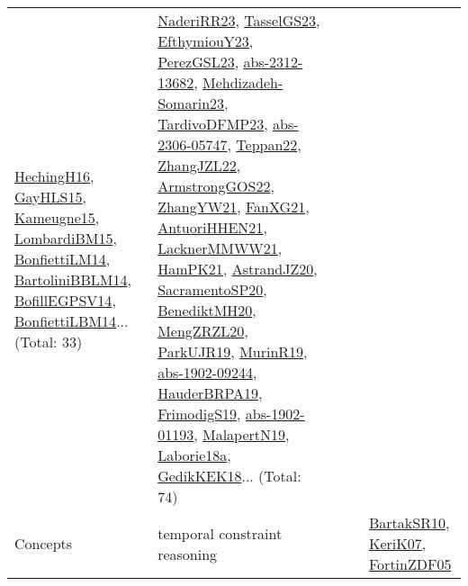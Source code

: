 {\begin{longtable}{lp{3cm}>{\raggedright}p{6cm}>{\raggedright}p{6cm}p{8cm}}
\href{papers/HechingH16.pdf}{HechingH16}\cite{HechingH16}, \href{papers/GayHLS15.pdf}{GayHLS15}\cite{GayHLS15}, \href{articles/Kameugne15.pdf}{Kameugne15}\cite{Kameugne15}, \href{papers/LombardiBM15.pdf}{LombardiBM15}\cite{LombardiBM15}, \href{papers/BonfiettiLM14.pdf}{BonfiettiLM14}\cite{BonfiettiLM14}, \href{papers/BartoliniBBLM14.pdf}{BartoliniBBLM14}\cite{BartoliniBBLM14}, \href{papers/BofillEGPSV14.pdf}{BofillEGPSV14}\cite{BofillEGPSV14}, \href{articles/BonfiettiLBM14.pdf}{BonfiettiLBM14}\cite{BonfiettiLBM14}... (Total: 33) & \href{articles/NaderiRR23.pdf}{NaderiRR23}\cite{NaderiRR23}, \href{papers/TasselGS23.pdf}{TasselGS23}\cite{TasselGS23}, \href{papers/EfthymiouY23.pdf}{EfthymiouY23}\cite{EfthymiouY23}, \href{papers/PerezGSL23.pdf}{PerezGSL23}\cite{PerezGSL23}, \href{articles/abs-2312-13682.pdf}{abs-2312-13682}\cite{abs-2312-13682}, \href{papers/Mehdizadeh-Somarin23.pdf}{Mehdizadeh-Somarin23}\cite{Mehdizadeh-Somarin23}, \href{papers/TardivoDFMP23.pdf}{TardivoDFMP23}\cite{TardivoDFMP23}, \href{articles/abs-2306-05747.pdf}{abs-2306-05747}\cite{abs-2306-05747}, \href{papers/Teppan22.pdf}{Teppan22}\cite{Teppan22}, \href{papers/ZhangJZL22.pdf}{ZhangJZL22}\cite{ZhangJZL22}, \href{papers/ArmstrongGOS22.pdf}{ArmstrongGOS22}\cite{ArmstrongGOS22}, \href{articles/ZhangYW21.pdf}{ZhangYW21}\cite{ZhangYW21}, \href{articles/FanXG21.pdf}{FanXG21}\cite{FanXG21}, \href{papers/AntuoriHHEN21.pdf}{AntuoriHHEN21}\cite{AntuoriHHEN21}, \href{papers/LacknerMMWW21.pdf}{LacknerMMWW21}\cite{LacknerMMWW21}, \href{articles/HamPK21.pdf}{HamPK21}\cite{HamPK21}, \href{articles/AstrandJZ20.pdf}{AstrandJZ20}\cite{AstrandJZ20}, \href{articles/SacramentoSP20.pdf}{SacramentoSP20}\cite{SacramentoSP20}, \href{articles/BenediktMH20.pdf}{BenediktMH20}\cite{BenediktMH20}, \href{articles/MengZRZL20.pdf}{MengZRZL20}\cite{MengZRZL20}, \href{papers/ParkUJR19.pdf}{ParkUJR19}\cite{ParkUJR19}, \href{papers/MurinR19.pdf}{MurinR19}\cite{MurinR19}, \href{articles/abs-1902-09244.pdf}{abs-1902-09244}\cite{abs-1902-09244}, \href{articles/HauderBRPA19.pdf}{HauderBRPA19}\cite{HauderBRPA19}, \href{papers/FrimodigS19.pdf}{FrimodigS19}\cite{FrimodigS19}, \href{articles/abs-1902-01193.pdf}{abs-1902-01193}\cite{abs-1902-01193}, \href{papers/MalapertN19.pdf}{MalapertN19}\cite{MalapertN19}, \href{papers/Laborie18a.pdf}{Laborie18a}\cite{Laborie18a}, \href{articles/GedikKEK18.pdf}{GedikKEK18}\cite{GedikKEK18}... (Total: 74)\\
Concepts & temporal constraint reasoning &  &  & \href{articles/BartakSR10.pdf}{BartakSR10}\cite{BartakSR10}, \href{papers/KeriK07.pdf}{KeriK07}\cite{KeriK07}, \href{papers/FortinZDF05.pdf}{FortinZDF05}\cite{FortinZDF05}\\

\end{longtable}}
